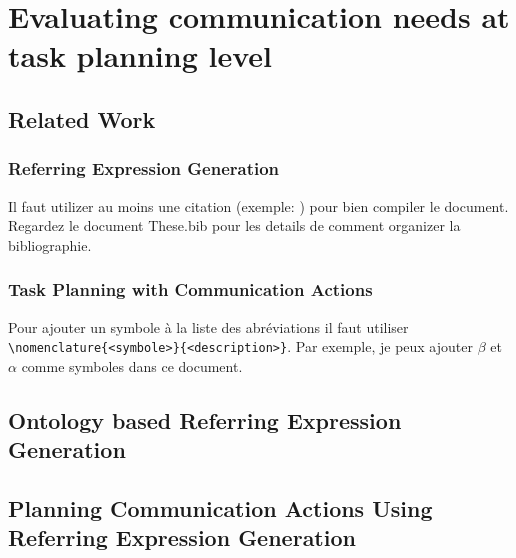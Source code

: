\documentclass[a4paper,11pt,twoside]{StyleThese}
\begin{document}
\setcounter{chapter}{2} %
\dominitoc
\faketableofcontents
\fi

\chapter{Evaluating communication needs at task planning level}
\minitoc

\section{Related Work}
\subsection{Referring Expression Generation}

Il faut utilizer au moins une citation (exemple: \cite{goossens93}) pour bien
compiler le document. Regardez le document These.bib pour les details de
comment organizer la bibliographie.

\subsection{Task Planning with Communication Actions}

Pour ajouter un symbole à la liste des abréviations il faut utiliser
\verb|\nomenclature{<symbole>}{<description>}|. Par exemple, je peux ajouter
$\beta$ et
$\alpha$ comme
symboles dans ce document.

\section{Ontology based Referring Expression Generation}

\section{Planning Communication Actions Using Referring Expression Generation}

\ifdefined{}
\else


\end{document}
